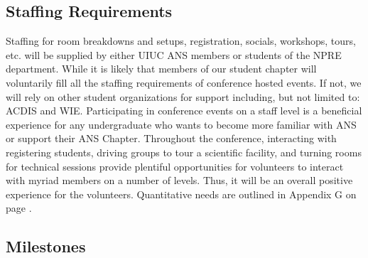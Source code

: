 \subsection{Staffing Requirements}
Staffing for room breakdowns and setups, registration, socials, workshops, tours, etc.  will be supplied by either UIUC ANS members or students of the NPRE department. While it is likely that members of our student chapter will voluntarily fill all the staffing requirements of conference hosted events. If not, we will rely on other student organizations for support including, but not limited to: ACDIS and WIE. Participating in conference events on a staff level is a beneficial experience for any undergraduate who wants to become more familiar with ANS or support their ANS Chapter. Throughout the conference, interacting with registering students, driving groups to tour a scientific facility, and turning rooms for technical sessions provide plentiful opportunities for volunteers to interact with myriad members on a number of levels. Thus, it will be an overall positive experience for the volunteers. Quantitative needs are outlined in Appendix G on page \pageref{appendix:staff}.

\newpage
\subsection{Milestones}

